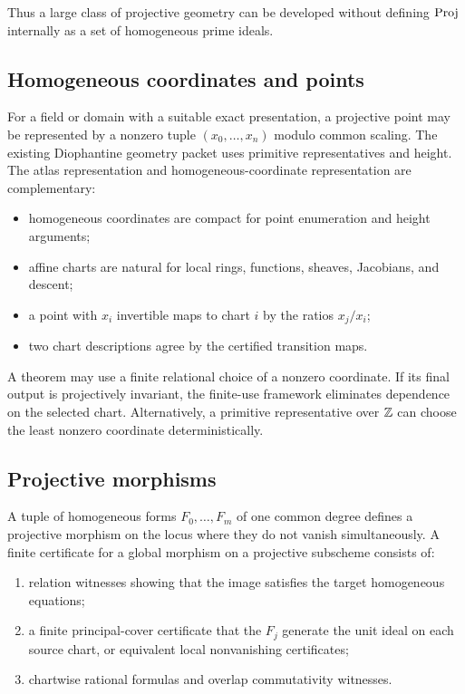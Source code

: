 Thus a large class of projective geometry can be developed without defining $\operatorname{Proj}$ internally as a
set of homogeneous prime ideals.

\subsection{Homogeneous coordinates and points}

For a field or domain with a suitable exact presentation, a projective point may be represented by a
nonzero tuple $(x_0,\ldots,x_n)$ modulo common scaling.  The existing Diophantine geometry packet
uses primitive representatives and height.  The atlas representation and homogeneous-coordinate
representation are complementary:

\begin{itemize}
\item homogeneous coordinates are compact for point enumeration and height arguments;
\item affine charts are natural for local rings, functions, sheaves, Jacobians, and descent;
\item a point with $x_i$ invertible maps to chart $i$ by the ratios $x_j/x_i$;
\item two chart descriptions agree by the certified transition maps.
\end{itemize}

A theorem may use a finite relational choice of a nonzero coordinate.  If its final output is
projectively invariant, the finite-use framework eliminates dependence on the selected chart.
Alternatively, a primitive representative over $\mathbb Z$ can choose the least nonzero coordinate
deterministically.

\subsection{Projective morphisms}

A tuple of homogeneous forms $F_0,\ldots,F_m$ of one common degree defines a projective morphism on
the locus where they do not vanish simultaneously.  A finite certificate for a global morphism on a
projective subscheme consists of:

\begin{enumerate}[label=(\alph*)]
\item relation witnesses showing that the image satisfies the target homogeneous equations;
\item a finite principal-cover certificate that the $F_j$ generate the unit ideal on each source
      chart, or equivalent local nonvanishing certificates;
\item chartwise rational formulas and overlap commutativity witnesses.
\end{enumerate}

